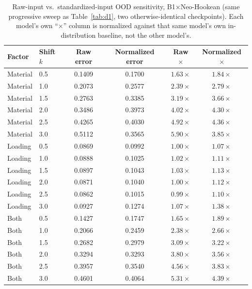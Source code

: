 \documentclass[final,5p,times]{elsarticle}
\begin{document}
\begin{table}[ht]
\centering
\caption{Raw-input vs.\ standardized-input OOD sensitivity, B1$\times$Neo-Hookean
  (same progressive sweep as Table~\ref{tab:d1}, two otherwise-identical
  checkpoints). Each model's own ``$\times$'' column is normalized against
  that same model's own in-distribution baseline, not the other model's.}
\label{tab:d2}
\small
\begin{tabular}{llcccc}
\toprule
Factor & Shift $k$ & Raw error & Normalized error & Raw $\times$ & Normalized $\times$ \\
\midrule
Material & 0.5 & 0.1409 & 0.1700 & $1.63\times$ & $1.84\times$ \\
Material & 1.0 & 0.2073 & 0.2577 & $2.39\times$ & $2.79\times$ \\
Material & 1.5 & 0.2763 & 0.3385 & $3.19\times$ & $3.66\times$ \\
Material & 2.0 & 0.3486 & 0.3973 & $4.02\times$ & $4.30\times$ \\
Material & 2.5 & 0.4265 & 0.4030 & $4.92\times$ & $4.36\times$ \\
Material & 3.0 & 0.5112 & 0.3565 & $5.90\times$ & $3.85\times$ \\
\midrule
Loading  & 0.5 & 0.0869 & 0.0992 & $1.00\times$ & $1.07\times$ \\
Loading  & 1.0 & 0.0888 & 0.1025 & $1.02\times$ & $1.11\times$ \\
Loading  & 1.5 & 0.0897 & 0.1043 & $1.03\times$ & $1.13\times$ \\
Loading  & 2.0 & 0.0871 & 0.1040 & $1.00\times$ & $1.12\times$ \\
Loading  & 2.5 & 0.0862 & 0.1015 & $0.99\times$ & $1.10\times$ \\
Loading  & 3.0 & 0.0927 & 0.1274 & $1.07\times$ & $1.38\times$ \\
\midrule
Both     & 0.5 & 0.1427 & 0.1747 & $1.65\times$ & $1.89\times$ \\
Both     & 1.0 & 0.2066 & 0.2459 & $2.38\times$ & $2.66\times$ \\
Both     & 1.5 & 0.2682 & 0.2979 & $3.09\times$ & $3.22\times$ \\
Both     & 2.0 & 0.3294 & 0.3293 & $3.80\times$ & $3.56\times$ \\
Both     & 2.5 & 0.3957 & 0.3540 & $4.56\times$ & $3.83\times$ \\
Both     & 3.0 & 0.4601 & 0.4064 & $5.31\times$ & $4.39\times$ \\
\bottomrule
\end{tabular}
\end{table}
\end{document}

